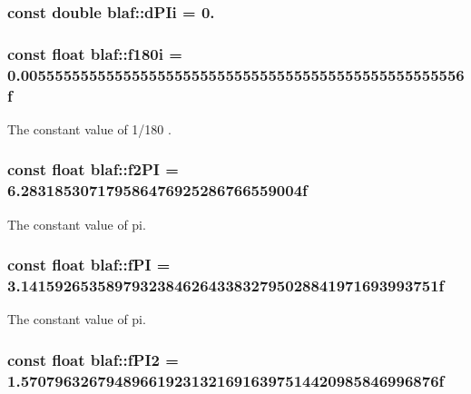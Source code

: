\hypertarget{namespaceblaf_a4e8539a7ba1e59181f96a61f75e0d5c4}{
\subsubsection[{d\-P\-Ii}]{\setlength{\rightskip}{0pt plus 5cm}const double {\bf blaf\-::d\-P\-Ii} = 0.}}\label{namespaceblaf_a4e8539a7ba1e59181f96a61f75e0d5c4}
\hypertarget{namespaceblaf_a270acc6912897636164a3a4e43592b56}{
\subsubsection[{f180i}]{\setlength{\rightskip}{0pt plus 5cm}const float {\bf blaf\-::f180i} = 0.\-0055555555555555555555555555555555555555555555555556f}}\label{namespaceblaf_a270acc6912897636164a3a4e43592b56}


\-The constant value of 1/180 . 

\hypertarget{namespaceblaf_a41ca3a503ed60c1cd58e835e9a2c4a24}{
\subsubsection[{f2\-P\-I}]{\setlength{\rightskip}{0pt plus 5cm}const float {\bf blaf\-::f2\-P\-I} = 6.\-283185307179586476925286766559004f}}\label{namespaceblaf_a41ca3a503ed60c1cd58e835e9a2c4a24}


\-The constant value of pi. 

\hypertarget{namespaceblaf_a5a52b16b2ea821b08e581b86b1eba264}{
\subsubsection[{f\-P\-I}]{\setlength{\rightskip}{0pt plus 5cm}const float {\bf blaf\-::f\-P\-I} = 3.\-1415926535897932384626433832795028841971693993751f}}\label{namespaceblaf_a5a52b16b2ea821b08e581b86b1eba264}


\-The constant value of pi. 

\hypertarget{namespaceblaf_a412381b69e677733ea60507300a9ed89}{
\subsubsection[{f\-P\-I2}]{\setlength{\rightskip}{0pt plus 5cm}const float {\bf blaf\-::f\-P\-I2} = 1.\-5707963267948966192313216916397514420985846996876f}}\label{namespaceblaf_a412381b69e677733ea60507300a9ed89}



